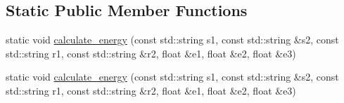 \subsection*{Static Public Member Functions}
\begin{DoxyCompactItemize}
\item 
static void \hyperlink{class_ract_i_p_a8137a774f9759043e847407bdecbab91}{calculate\+\_\+energy} (const std\+::string s1, const std\+::string \&s2, const std\+::string r1, const std\+::string \&r2, float \&e1, float \&e2, float \&e3)
\item 
static void \hyperlink{class_ract_i_p_aa95211d636829c7878196947437476c8}{calculate\+\_\+energy} (const std\+::string s1, const std\+::string \&s2, const std\+::string r1, const std\+::string \&r2, float \&e1, float \&e2, float \&e3)
\end{DoxyCompactItemize}


